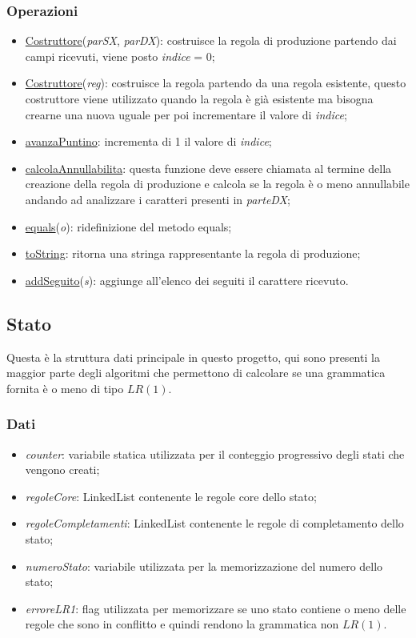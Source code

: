 \documentclass[12pt]{article}
\begin{document}
\subsubsection{Operazioni}
\begin{itemize}
\item\underline{Costruttore}(\textit{parSX}, \textit{parDX}): costruisce la regola di produzione partendo dai campi ricevuti, viene posto \textit{indice} = 0;
\item\underline{Costruttore}(\textit{reg}): costruisce la regola partendo da una regola esistente, questo costruttore viene utilizzato quando la regola è già esistente ma bisogna crearne una nuova uguale per poi incrementare il valore di \textit{indice};
\item\underline{avanzaPuntino}: incrementa di 1 il valore di \textit{indice};
\item\underline{calcolaAnnullabilita}: questa funzione deve essere chiamata al termine della creazione della regola di produzione e calcola se la regola è o meno annullabile andando ad analizzare i caratteri presenti in \textit{parteDX};
\item\underline{equals}(\textit{o}): ridefinizione del metodo equals;
\item\underline{toString}: ritorna una stringa rappresentante la regola di produzione;
\item\underline{addSeguito}(\textit{s}): aggiunge all'elenco dei seguiti il carattere ricevuto.
\end{itemize}

\subsection{Stato}
Questa è la struttura dati principale in questo progetto, qui sono presenti la maggior parte degli algoritmi che permettono di calcolare se una grammatica fornita è o meno di tipo $LR \left( 1 \right)$.
\subsubsection{Dati}
\begin{itemize}
\item\textit{counter}: variabile statica utilizzata per il conteggio progressivo degli stati che vengono creati;
\item\textit{regoleCore}: LinkedList contenente le regole core dello stato;
\item\textit{regoleCompletamenti}: LinkedList contenente le regole di completamento dello stato;
\item\textit{numeroStato}: variabile utilizzata per la memorizzazione del numero dello stato;
\item\textit{erroreLR1}: flag utilizzata per memorizzare se uno stato contiene o meno delle regole che sono in conflitto e quindi rendono la grammatica non $LR \left( 1 \right)$.
\end{itemize}
\end{document}
